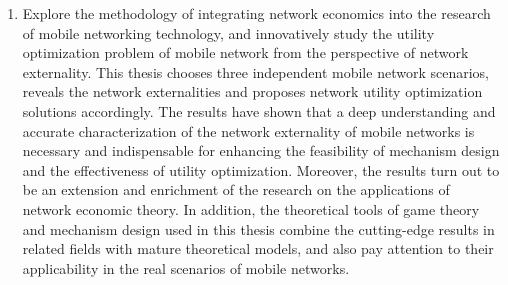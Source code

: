 \begin{englishabstract}
\begin{enumerate}
		\item Explore the methodology of integrating network economics into the research of mobile networking technology, and innovatively study the utility optimization problem of mobile network from the perspective of network externality. This thesis chooses three independent mobile network scenarios, reveals the network externalities and proposes network utility optimization solutions accordingly. The results have shown that a deep understanding and accurate characterization of the network externality of mobile networks is necessary and indispensable for enhancing the feasibility of mechanism design and the effectiveness of utility optimization. Moreover, the results turn out to be an extension and enrichment of the research on the applications of network economic theory. In addition, the theoretical tools of game theory and mechanism design used in this thesis combine the cutting-edge results in related fields with mature theoretical models, and also pay attention to their applicability in the real scenarios of mobile networks.
	\end{enumerate}


\end{englishabstract}
